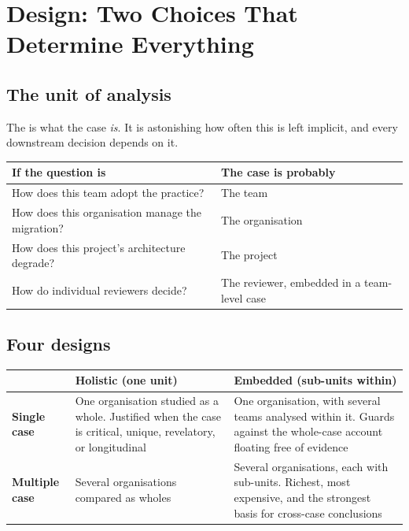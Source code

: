 \section{Design: Two Choices That Determine Everything}

\subsection{The unit of analysis}

The  is what the case \emph{is}. It is astonishing how
often this is left implicit, and every downstream decision depends on it.

\begin{center}
\small
\begin{tabular}{@{}L{5.2cm}L{9.1cm}@{}}
\toprule
\textbf{If the question is} & \textbf{The case is probably} \\
\midrule
How does this team adopt the practice?         & The team \\
How does this organisation manage the migration? & The organisation \\
How does this project's architecture degrade?  & The project \\
How do individual reviewers decide?            & The reviewer, embedded in a
                                                 team-level case \\
\bottomrule
\end{tabular}
\end{center}

\subsection{Four designs}

\begin{center}
\small
\begin{tabular}{@{}L{2.6cm}L{5.6cm}L{5.6cm}@{}}
\toprule
 & \textbf{Holistic} (one unit) & \textbf{Embedded} (sub-units within) \\
\midrule
\textbf{Single case}
  & One organisation studied as a whole. Justified when the case is critical,
    unique, revelatory, or longitudinal
  & One organisation, with several teams analysed within it. Guards against
    the whole-case account floating free of evidence \\
\textbf{Multiple case}
  & Several organisations compared as wholes
  & Several organisations, each with sub-units. Richest, most expensive, and
    the strongest basis for cross-case conclusions \\
\bottomrule
\end{tabular}
\end{center}

